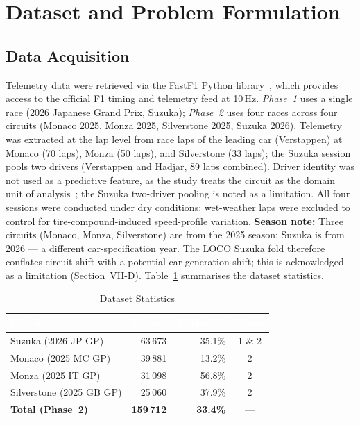 \documentclass[conference,a4paper]{IEEEtran}
\begin{document}
\section{Dataset and Problem Formulation}

\subsection{Data Acquisition}

Telemetry data were retrieved via the FastF1 Python library~\cite{ref_fastf1},
which provides access to the official F1 timing and telemetry feed at 10\,Hz.
\emph{Phase~1} uses a single race (2026 Japanese Grand Prix, Suzuka);
\emph{Phase~2} uses four races across four circuits (Monaco 2025, Monza 2025,
Silverstone 2025, Suzuka 2026).
Telemetry was extracted at the lap level from race laps of the leading car
(Verstappen) at Monaco (70 laps), Monza (50 laps), and Silverstone (33 laps); the Suzuka
session pools two drivers (Verstappen and Hadjar, 89 laps combined). Driver identity was
not used as a predictive feature, as the study treats the circuit as the domain unit of
analysis~\cite{ref_adatime}; the Suzuka two-driver pooling is noted as a limitation.
All four sessions were conducted under dry conditions; wet-weather laps were
excluded to control for tire-compound-induced speed-profile variation.
\textbf{Season note:} Three circuits (Monaco, Monza, Silverstone) are from the
2025 season; Suzuka is from 2026 — a different car-specification year.
The LOCO Suzuka fold therefore conflates circuit shift with a potential car-generation
shift; this is acknowledged as a limitation (Section~VII-D).
Table~\ref{tab:dataset} summarises the dataset statistics.

\begin{table}[h]
\caption{Dataset Statistics}
\label{tab:dataset}
\centering
\small
\renewcommand{\arraystretch}{1.25}
\begin{tabular}{lrrc}
\toprule
\rowcolor{hdrgreen}
\textcolor{white}{\textbf{Circuit}} &
\textcolor{white}{\textbf{Frames}} &
\textcolor{white}{\textbf{X-Mode\%}} &
\textcolor{white}{\textbf{Phase}} \\
\midrule
Suzuka (2026 JP GP) & 63\,673 & 35.1\% & 1 \& 2 \\
Monaco (2025 MC GP) & 39\,881 & 13.2\% & 2 \\
Monza  (2025 IT GP) & 31\,098 & 56.8\% & 2 \\
Silverstone (2025 GB GP) & 25\,060 & 37.9\% & 2 \\
\midrule
\textbf{Total (Phase~2)} & \textbf{159\,712} & \textbf{33.4\%} & — \\
\bottomrule
\end{tabular}
\end{table}
\end{document}
